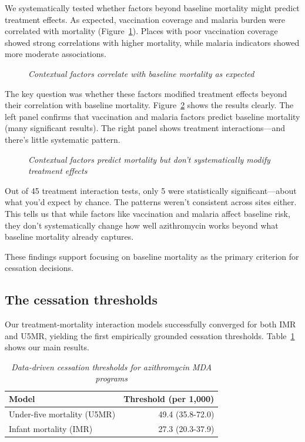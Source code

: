 \documentclass[11pt]{article}\usepackage[]{graphicx}\usepackage[]{xcolor}
\begin{document}
We systematically tested whether factors beyond baseline mortality might predict treatment effects. As expected, vaccination coverage and malaria burden were correlated with mortality (Figure~\ref{fig:correlation-matrix}). Places with poor vaccination coverage showed strong correlations with higher mortality, while malaria indicators showed more moderate associations.

\begin{figure}[!h]
\centering
{}
\caption{\emph{Contextual factors correlate with baseline mortality as expected}}
\label{fig:correlation-matrix}
\end{figure}

The key question was whether these factors modified treatment effects beyond their correlation with baseline mortality. Figure~\ref{fig:contextual-analysis} shows the results clearly. The left panel confirms that vaccination and malaria factors predict baseline mortality (many significant results). The right panel shows treatment interactions---and there's little systematic pattern.

\begin{figure}[!h]
\centering
{}
\caption{\emph{Contextual factors predict mortality but don't systematically modify treatment effects}}
\label{fig:contextual-analysis}
\end{figure}

Out of 45 treatment interaction tests, only 5 were statistically significant---about what you'd expect by chance. The patterns weren't consistent across sites either. This tells us that while factors like vaccination and malaria affect baseline risk, they don't systematically change how well azithromycin works beyond what baseline mortality already captures.

These findings support focusing on baseline mortality as the primary criterion for cessation decisions.

\newpage
\subsection{The cessation thresholds}

Our treatment-mortality interaction models successfully converged for both IMR and U5MR, yielding the first empirically grounded cessation thresholds. Table~\ref{tab:thresholds} shows our main results.

\begin{table}[H]
\centering
\caption{\label{tab:threshold-results-table}\label{tab:thresholds}\emph{Data-driven cessation thresholds for azithromycin MDA programs}}
\centering
\begin{tabular}[t]{lr}
\toprule
Model & Threshold (per 1,000)\\
\midrule
Under-five mortality (U5MR) & 49.4 (35.8-72.0)\\
Infant mortality (IMR) & 27.3 (20.3-37.9)\\
\bottomrule
\end{tabular}
\end{table}
\end{document}
